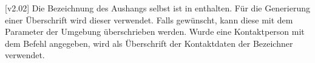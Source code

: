 \begin{DeclareEntity}{}
\begin{Declaration}
  {}
\begin{Declaration}
  {}
  [v2.02]
\printdeclarationlist
%
Die Bezeichnung des Aushangs selbst ist in  enthalten. Für 
die Generierung einer Überschrift wird dieser verwendet. Falls gewünscht, kann 
diese mit dem Parameter  der Umgebung 
 überschrieben werden. Wurde eine Kontaktperson mit dem 
Befehl  angegeben, wird als Überschrift der Kontaktdaten 
der Bezeichner  verwendet.
\TermTable%
\end{Declaration}
\end{Declaration}
%
\end{DeclareEntity}
